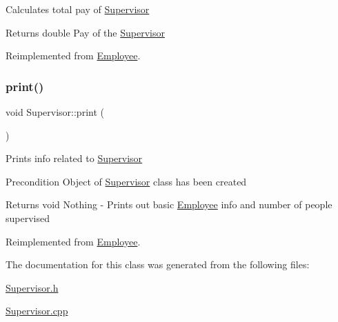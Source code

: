 Calculates total pay of \hyperlink{classSupervisor}{Supervisor}

\begin{DoxyReturn}{Returns}
double Pay of the \hyperlink{classSupervisor}{Supervisor} 
\end{DoxyReturn}


Reimplemented from \hyperlink{classEmployee_a01c2c44e15434237db28832f6972e960}{Employee}.

\mbox{\label{classSupervisor_a92483dc9a54904d79b46c6ec4efb3f54}} 
\subsubsection{\texorpdfstring{print()}{print()}}
{\footnotesize\ttfamily void Supervisor\+::print (\begin{DoxyParamCaption}{ }\end{DoxyParamCaption})\hspace{0.3cm}{\ttfamily [virtual]}}

Prints info related to \hyperlink{classSupervisor}{Supervisor}

\begin{DoxyPrecond}{Precondition}
Object of \hyperlink{classSupervisor}{Supervisor} class has been created 
\end{DoxyPrecond}
\begin{DoxyReturn}{Returns}
void Nothing -\/ Prints out basic \hyperlink{classEmployee}{Employee} info and number of people supervised 
\end{DoxyReturn}


Reimplemented from \hyperlink{classEmployee_a79556ad700627dba88049f487a34a762}{Employee}.



The documentation for this class was generated from the following files\+:\begin{DoxyCompactItemize}
\item 
\hyperlink{Supervisor_8h}{Supervisor.\+h}\item 
\hyperlink{Supervisor_8cpp}{Supervisor.\+cpp}\end{DoxyCompactItemize}
